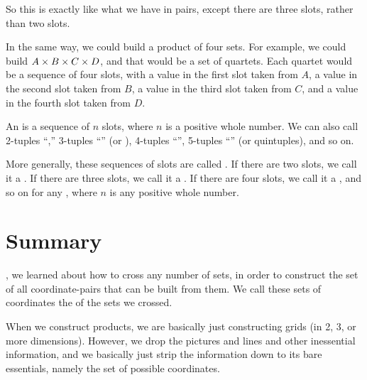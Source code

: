 \documentclass[../../../main.tex]{subfiles}
\begin{document}
So this is exactly like what we have in pairs, except there are three slots, rather than two slots.

In the same way, we could build a product of four sets. For example, we could build $A \times B \times C \times D$, and that would be a set of quartets. Each quartet would be a sequence of four slots, with a value in the first slot taken from $A$, a value in the second slot taken from $B$, a value in the third slot taken from $C$, and a value in the fourth slot taken from $D$.

\begin{terminology}
  An  is a sequence of $n$ slots, where $n$ is a positive whole number. We can also call 2-tuples ``,'' 3-tuples ``'' (or ), 4-tuples ``'', 5-tuples ``'' (or quintuples), and so on.
\end{terminology}

More generally, these sequences of slots are called . If there are two slots, we call it a . If there are three slots, we call it a . If there are four slots, we call it a , and so on for any , where $n$ is any positive whole number.


\section{Summary}

, we learned about how to cross any number of sets, in order to construct the set of all coordinate-pairs that can be built from them. We call these sets of coordinates the  of the sets we crossed. 

When we construct products, we are basically just constructing grids (in 2, 3, or more dimensions). However, we drop the pictures and lines and other inessential information, and we basically just strip the information down to its bare essentials, namely the set of possible coordinates.
\end{document}
